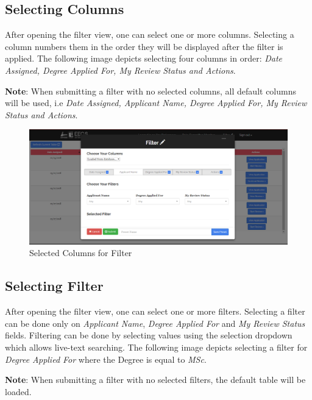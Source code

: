 \documentclass[fontsize=12pt,paper=letter,twoside]{scrartcl}
\begin{document}
\newpage
\subsection{Selecting Columns}

After opening the filter view, one can select one or more columns. Selecting a column numbers them in the order they will be displayed after the filter is applied. The following image depicts selecting four columns in order: \emph{Date Assigned, Degree Applied For, My Review Status and Actions}.

\bigskip
\noindent \textbf{Note}: When submitting a filter with no selected columns, all default columns will be used, i.e \emph{Date Assigned, Applicant Name, Degree Applied For, My Review Status and Actions}.

\begin{figure}[!htb]
\begin{center}
\includegraphics[width=.9\textwidth]{images/selected_col.png}
\end{center}
\caption{Selected Columns for Filter}
\label{fig:fm_selected_col}
\end{figure}

\subsection{Selecting Filter}

After opening the filter view, one can select one or more filters. Selecting a filter can be done only on \emph{Applicant Name}, \emph{Degree Applied For} and \emph{My Review Status} fields. Filtering can be done by selecting values using the selection dropdown which allows live-text searching. The following image depicts selecting a filter for \emph{Degree Applied For} where the Degree is equal to \emph{MSc}.

\bigskip
\noindent \textbf{Note}: When submitting a filter with no selected filters, the default table will be loaded.
\end{document}
